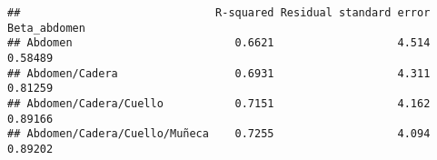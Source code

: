 \documentclass[
]{article}
\begin{document}
\begin{verbatim}
##                              R-squared Residual standard error Beta_abdomen
## Abdomen                         0.6621                   4.514      0.58489
## Abdomen/Cadera                  0.6931                   4.311      0.81259
## Abdomen/Cadera/Cuello           0.7151                   4.162      0.89166
## Abdomen/Cadera/Cuello/Muñeca    0.7255                   4.094      0.89202
\end{verbatim}
\end{document}
